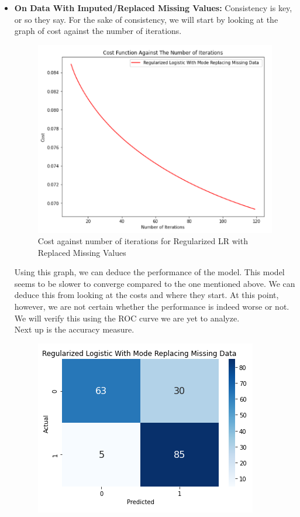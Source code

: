 \begin{itemize}
    \item \textbf{On Data With Imputed/Replaced Missing Values:} Consistency is key, or so they say. For the sake of consistency, we will start by looking at the graph of cost against the number of iterations. 
    \begin{figure}[H]
        \begin{center}
            \includegraphics[scale=0.6]{Images/RR_C.png}
        \end{center}
        \caption{Cost against number of iterations for Regularized LR with Replaced Missing Values}
    \end{figure}
    Using this graph, we can deduce the performance of the model. This model seems to be slower to converge compared to the one mentioned above. We can deduce this from looking at the costs and where they start. At this point, however, we are not certain whether the performance is indeed worse or not. We will verify this using the ROC curve we are yet to analyze.
    \\
    Next up is the accuracy measure. 
    \begin{figure}[H]
        \begin{center}
            \includegraphics[scale=0.6]{Images/RR_CM.png}

\end{center}
\end{figure}
\end{itemize}
